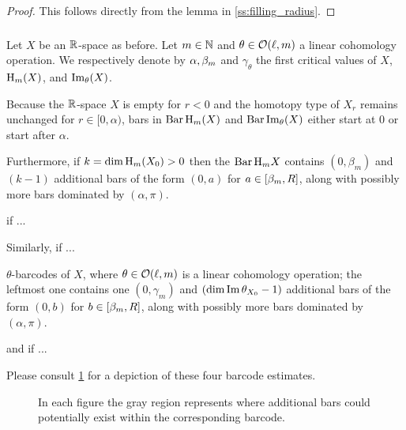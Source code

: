 \begin{proof}
	This follows directly from the lemma in \cref{ss:filling_radius}.
\end{proof}


\subsubsection{}\label{subsub:barcode_general}

Let $X$ be an $\mathbb{R}$-space as before.
Let \(m \in \mathbb{N}\) and \(\theta \in \mathcal{O}(\ell,m)\) a linear cohomology operation.
We respectively denote by $\alpha, \beta_m$ and $\gamma_\theta$ the first critical values of $X$, \(\mathrm{H}_m(X)\), and \(\operatorname{Im}_\theta(X)\).

Because the $\mathbb{R}$-space $X$ is empty for \(r < 0\) and the homotopy type of $X_r$ remains unchanged for $r \in [0, \alpha)$, bars in \(\operatorname{Bar} \mathrm{H}_m(X)\) and $\operatorname{Bar}\operatorname{Im}_\theta(X)$ either start at $0$ or start after $\alpha$.

Furthermore, if \(k = \dim \operatorname{H}_m(X_0) > 0\) then the $\operatorname{Bar}\mathrm{H}_m X$ contains $(0,\beta_m)$ and \((k - 1)\) additional bars of the form \((0, a)\) for \(a \in [\beta_m, R]\), along with possibly more bars dominated by \((\alpha, \pi)\).


if ...

Similarly, if ...

$\theta$-barcodes of $X$, where $\theta\in\mathcal{O}(\ell,m)$ is a linear cohomology operation; the leftmost one contains one \((0, \gamma_m)\) and \((\dim \operatorname{Im} \theta_{X_0} - 1)\) additional bars of the form \((0, b)\) for \(b \in [\beta_m, R]\), along with possibly more bars dominated by \((\alpha, \pi)\).

and if ...

Please consult \cref{fig:barcodes_general} for a depiction of these four barcode estimates.

\begin{figure}
	\centering
	
	\caption{In each figure the gray region represents where additional bars could potentially exist within the corresponding barcode.}
	\label{fig:barcodes_general}
\end{figure}